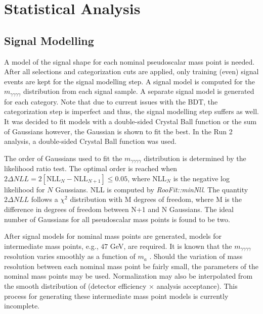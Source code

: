 \documentclass[12pt]{article}
\begin{document}
\section{Statistical Analysis}
\subsection{Signal Modelling}
A model of the signal shape for each nominal pseudoscalar mass point is needed. After all selections and categorization cuts are applied, only training (even) signal events are kept for the signal modelling step. A signal model is computed for the $m_{\gamma \gamma \gamma \gamma}$ distribution from each signal sample. A separate signal model is generated for each category. Note that due to current issues with the BDT, the categorization step is imperfect and thus, the signal modelling step suffers as well. It was decided to fit models with a double-sided Crystal Ball function or the sum of Gaussians however, the Gaussian is shown to fit the best. In the Run 2 analysis, a double-sided Crystal Ball function was used.\par

The order of Gaussians used to fit the $m_{\gamma \gamma \gamma \gamma}$ distribution is determined by the likelihood ratio test. The optimal order is reached when $2\Delta NLL = 2[\text{NLL}_{N} - \text{NLL}_{N+1}] \leq 0.05$, where $\text{NLL}_{N}$ is the negative log likelihood for $N$ Gaussians. NLL is computed by \textit{RooFit::minNll}. The quantity $2\Delta NLL$ follows a $\chi^2$ distribution with M degrees of freedom, where M is the difference in degrees of freedom between N+1 and N Gaussians. The ideal number of Gaussians for all pseudoscalar mass points is found to be two.\par

After signal models for nominal mass points are generated, models for intermediate mass points, e.g., $47$ GeV, are required. It is known that the $m_{\gamma\gamma\gamma\gamma}$ resolution varies smoothly as a function of $m_{a}$ \cite{Run2_analysis}. Should the variation of mass resolution between each nominal mass point be fairly small, the parameters of the nominal mass points may be used. Normalization may also be interpolated from the smooth distribution of (detector efficiency $\times$ analysis acceptance). This process for generating these intermediate mass point models is currently incomplete.\par
\end{document}
